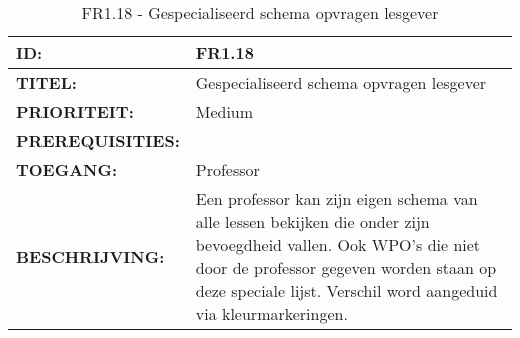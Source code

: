 \noindent\begin{table}[H]
            \begin{tabular}{l | p{10cm}}
                \textbf{ID:} & FR1.18 \\ \hline
                \textbf{TITEL:} & Gespecialiseerd schema opvragen lesgever\\ \hline
                \textbf{PRIORITEIT:} &  Medium \\ \hline
                \textbf{PREREQUISITIES:} & \\ \hline
                \textbf{TOEGANG:} & Professor \\ \hline
                \textbf{BESCHRIJVING:} & Een professor kan zijn eigen schema van alle lessen bekijken die onder zijn bevoegdheid vallen. Ook WPO's die niet door de professor gegeven worden staan op deze speciale lijst. Verschil word aangeduid via kleurmarkeringen. \\ 
            \end{tabular}\\
            \caption{FR1.18 - Gespecialiseerd schema opvragen lesgever}
            \label{tab:FR1.18 - Gespecializeerd schema opvragen lesgever}
        \end{table}

